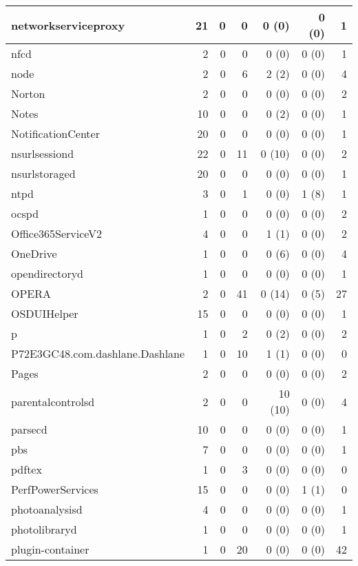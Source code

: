 \begin{adjustwidth}{-2in}{}
\begin{scriptsize}
\begin{longtable}[l]{ l | r | r | r | r | r | r }
    networkserviceproxy & 21 &  0 &  0 &  0 (0) &  0 (0) &  1 \\ \hline
    nfcd & 2 &  0 &  0 &  0 (0) &  0 (0) &  1 \\ \hline
    node & 2 &  0 &  6 &  2 (2) &  0 (0) &  4 \\ \hline
    Norton & 2 &  0 &  0 &  0 (0) &  0 (0) &  2 \\ \hline
    Notes & 10 &  0 &  0 &  0 (2) &  0 (0) &  1 \\ \hline
    NotificationCenter &  20 &  0 &  0 &  0 (0) &  0 (0) &  1 \\ \hline
    nsurlsessiond & 22 &  0 & 11 & 0 (10) &  0 (0) &  2 \\ \hline
    nsurlstoraged & 20 &  0 &  0 &  0 (0) &  0 (0) &  1 \\ \hline
    ntpd & 3 &  0 &  1 &  0 (0) &  1 (8) &  1 \\ \hline
    ocspd &  1 &  0 &  0 &  0 (0) &  0 (0) &  2 \\ \hline
    Office365ServiceV2 & 4 &  0 &  0 &  1 (1) &  0 (0) &  2 \\ \hline
    OneDrive & 1 &  0 &  0 &  0 (6) &  0 (0) &  4 \\ \hline
    opendirectoryd & 1 &  0 &  0 &  0 (0) &  0 (0) &  1 \\ \hline
    OPERA &  2 &  0 & 41 & 0 (14) &  0 (5) & 27 \\ \hline
    OSDUIHelper & 15 &  0 &  0 &  0 (0) &  0 (0) &  1 \\ \hline
    p &  1 &  0 &  2 &  0 (2) &  0 (0) &  2 \\ \hline
    P72E3GC48.com.dashlane.Dashlane &  1 &  0 & 10 &  1 (1) &  0 (0) &  0 \\ \hline
    Pages &  2 &  0 &  0 &  0 (0) &  0 (0) &  2 \\ \hline
    parentalcontrolsd &  2 &  0 &  0 &  10 (10) &  0 (0) &  4 \\ \hline
    parsecd & 10 &  0 &  0 &  0 (0) &  0 (0) &  1 \\ \hline
    pbs &  7 &  0 &  0 &  0 (0) &  0 (0) &  1 \\ \hline
    pdftex & 1 &  0 &  3 &  0 (0) &  0 (0) &  0 \\ \hline
    PerfPowerServices & 15 &  0 &  0 &  0 (0) &  1 (1) &  0 \\ \hline
    photoanalysisd & 4 &  0 &  0 &  0 (0) &  0 (0) &  1 \\ \hline
    photolibraryd &  1 &  0 &  0 &  0 (0) &  0 (0) &  1 \\ \hline
    plugin-container & 1 &  0 & 20 &  0 (0) &  0 (0) & 42 \\ \hline

\end{longtable}
\end{scriptsize}
\end{adjustwidth}
